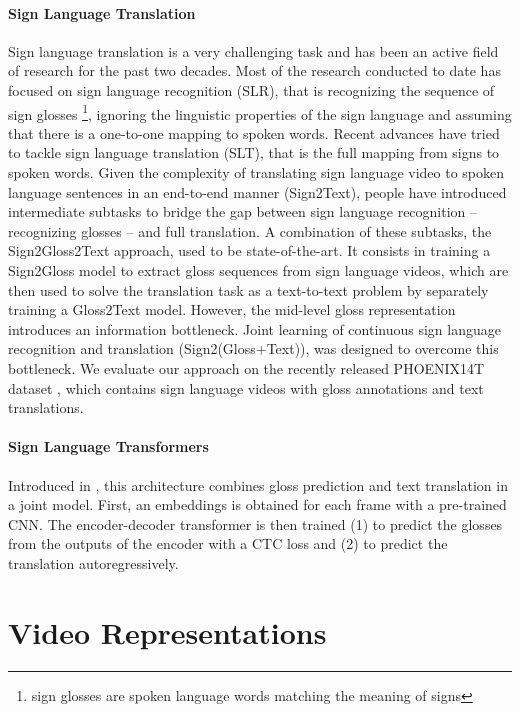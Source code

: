 \documentclass[final]{cvpr}
\begin{document}
\paragraph{Sign Language Translation}Sign language translation is a very challenging task and has been an active field of
research for the past two decades. Most of the research conducted to date has focused on sign language recognition (SLR), that is recognizing the sequence of sign glosses \footnote{sign glosses are spoken language words matching the meaning of signs}, ignoring the linguistic properties of the sign language and assuming that there is a one-to-one mapping to spoken words. Recent advances have tried to tackle sign language translation (SLT), that is the full mapping from signs to spoken words.
Given the complexity of translating sign language video to spoken language sentences in an end-to-end manner (Sign2Text), people have introduced intermediate subtasks to bridge the gap between sign language recognition -- recognizing glosses -- and full translation. A combination of these subtasks, the Sign2Gloss2Text approach, used to be state-of-the-art. It consists in training a Sign2Gloss model to extract gloss sequences from sign language videos, which are then used to solve the translation task as a text-to-text problem by separately training a Gloss2Text model. However, the mid-level gloss representation introduces an information bottleneck. Joint learning of continuous sign language recognition and translation (Sign2(Gloss+Text)), was designed to overcome this bottleneck. We evaluate our approach on the recently released PHOENIX14T dataset \cite{phoenix}, which contains sign language videos with gloss annotations and text translations.
\paragraph{Sign Language Transformers}
Introduced in \cite{neccam}, this architecture combines gloss prediction and text translation in a joint model. First, an embeddings is obtained for each frame with a pre-trained CNN. The encoder-decoder transformer is then trained (1) to predict the glosses from the outputs of the encoder with a CTC loss and (2) to predict the translation autoregressively.

\section{Video Representations}
\end{document}
